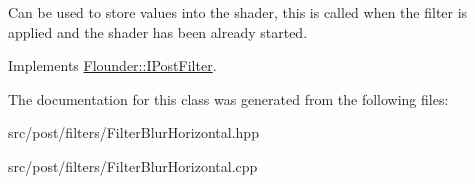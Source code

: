 Can be used to store values into the shader, this is called when the filter is applied and the shader has been already started. 



Implements \hyperlink{class_flounder_1_1_i_post_filter_a20420ec0a9bac67437740552bea9ab74}{Flounder\+::\+I\+Post\+Filter}.



The documentation for this class was generated from the following files\+:\begin{DoxyCompactItemize}
\item 
src/post/filters/Filter\+Blur\+Horizontal.\+hpp\item 
src/post/filters/Filter\+Blur\+Horizontal.\+cpp\end{DoxyCompactItemize}
